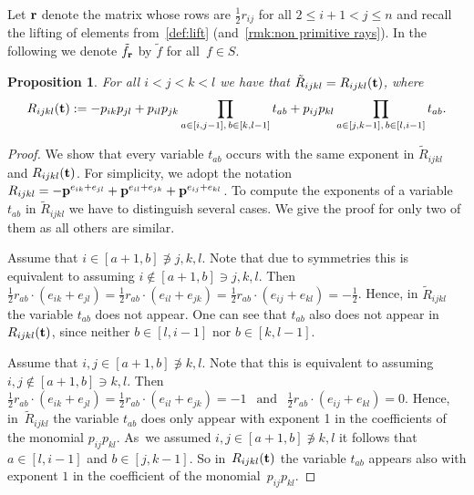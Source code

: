 \documentclass[10pt,a4paper]{amsart}
\newcommand{\thlabel}[1]{\label{#1}}
\newcommand{\thref}[1]{\ref{#1}}
\newtheorem{Proposition}[Theorem]{Proposition}
\numberwithin{equation}{section}
\begin{document}
Let ${\bf r}$ denote the matrix whose rows are $\frac{1}{2}r_{ij}$ for all $2\le i+1<j\le n$ and recall the lifting of elements from~\thref{def:lift} (and~\thref{rmk:non primitive rays}).
In the following we denote $\tilde f_{\bf r}$ by $\tilde f$ for all~$f\in S$.

\begin{Proposition}\thlabel{prop:univ and groebner}
For all $i<j<k<l$ we have that $\tilde R_{ijkl}=R_{ijkl}({\bf t})$, where
\begin{displaymath}%
 R_{ijkl}({\bf t}):= -p_{ik}p_{jl} + p_{il}p_{jk}\prod_{a\in[i,j-1],\,b\in[k,l-1]} t_{ab} + p_{ij}p_{kl}\prod_{a\in[j,k-1],\,b\in[l,i-1]}t_{ab}.
\end{displaymath}
\end{Proposition}

\begin{proof}
We show that every variable $t_{ab}$ occurs with the same exponent in $\tilde R_{ijkl}$ and $R_{ijkl}({\bf t})$.
For simplicity, we adopt the notation $R_{ijkl}=-{\bf p}^{e_{ik}+e_{jl}}+{\bf p}^{e_{il}+e_{jk}} + {\bf p}^{e_{ij}+e_{kl}}$.
To compute the exponents of a variable $t_{ab}$ in $\tilde R_{ijkl}$ we have to distinguish several cases. We give the proof for only two of them as all others are similar.
\medskip

 Assume that $i\in [a+1,b]\not\ni j,k,l$. Note that due to symmetries this is equivalent to assuming $i\not \in [a+1,b]\ni j,k,l$. Then
$\frac{1}{2}r_{ab}\cdot (e_{ik}+e_{jl})=\frac{1}{2}r_{ab}\cdot (e_{il}+e_{jk})=\frac{1}{2}r_{ab}\cdot (e_{ij}+e_{kl})=-\frac{1}{2}$.
Hence, in $\tilde R_{ijkl}$ the variable $t_{ab}$ does not appear. One can see that $t_{ab}$ also does not appear in $R_{ijkl}({\bf t})$, since neither $b\in[l,i-1]$ nor $b\in[k,l-1]$.
\medskip

 Assume that $i,j\in [a+1,b]\not\ni k,l$. Note that this is equivalent to assuming $i,j\not \in [a+1,b]\ni k,l$. Then $\frac{1}{2}r_{ab}\cdot (e_{ik}+e_{jl})=\frac{1}{2}r_{ab}\cdot (e_{il}+e_{jk})=-1 \ \ \text{ and }\ \ \frac{1}{2}r_{ab}\cdot (e_{ij}+e_{kl})=0$.
Hence, in~$\tilde R_{ijkl}$ the variable $t_{ab}$ does only appear with exponent 1 in the coefficients of the monomial $p_{ij}p_{kl}$.
As~we assumed $i,j\in [a+1,b]\not\ni k,l$ it follows that $a\in [l,i-1]$ and $b\in [j,k-1]$. So in~$R_{ijkl}({\bf t})$ the variable $t_{ab}$ appears also with exponent $1$ in the coefficient of the monomial~$p_{ij}p_{kl}$.
\end{proof}
\end{document}

